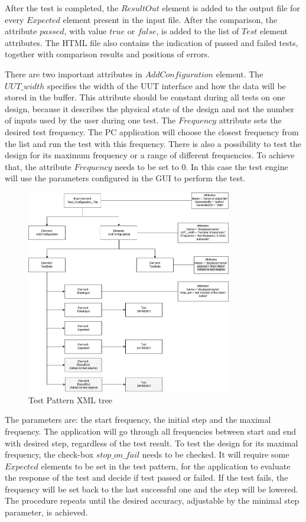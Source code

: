 After the test is completed, the $ResultOut$ element is added to the output file for every $Expected$ element present in the input file. After the comparison, the attribute $passed$, with value $true$ or $false$, is added to the list of $Test$ element attributes. The HTML file also contains the indication of passed and failed tests, together with comparison results and positions of errors.

There are two important attributes in $AddConfiguration$ element. The $UUT\_width$ specifies the width of the UUT interface and how the data will be stored in the buffer. This attribute should be constant during all tests on one design, because it describes the physical state of the design and not the number of inputs used by the user during one test. The $Frequency$ attribute sets the desired test frequency. The PC application will choose the closest frequency from the list and run the test with this frequency. There is also a possibility to test the design for its maximum frequency or a range of different frequencies. To achieve that, the attribute $Frequency$ needs to be set to $0$. In this case the test engine will use the parameters configured in the GUI to perform the test.

\begin{figure}[h]
\centering
\includegraphics[width=0.8\textwidth]{figures/XML_tree.png}
\caption{Test Pattern XML tree}
\label{fig:xml}
\end{figure}

The parameters are: the start frequency, the initial step and the maximal frequency. The application will go through all frequencies between start and end with desired step, regardless of the test result. To test the design for its maximal frequency, the check-box $stop\_on\_fail$ needs to be checked. It will require some $Expected$ elements to be set in the test pattern, for the application to evaluate the response of the test and decide if test passed or failed. If the test fails, the frequency will be set back to the last successful one and the step will be lowered. The procedure repeats until the desired accuracy, adjustable by the minimal step parameter, is achieved.

